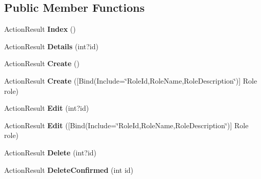 \subsection*{Public Member Functions}
\begin{DoxyCompactItemize}
\item 
Action\+Result {\bfseries Index} ()\hypertarget{class_p_c_builder_m_v_c_1_1_controllers_1_1_role_controller_a539d1b8b95c8cce64e2e6191070ab4f1}{}\label{class_p_c_builder_m_v_c_1_1_controllers_1_1_role_controller_a539d1b8b95c8cce64e2e6191070ab4f1}

\item 
Action\+Result {\bfseries Details} (int?id)\hypertarget{class_p_c_builder_m_v_c_1_1_controllers_1_1_role_controller_a622d75d4760677d73ecef02d8b7e4112}{}\label{class_p_c_builder_m_v_c_1_1_controllers_1_1_role_controller_a622d75d4760677d73ecef02d8b7e4112}

\item 
Action\+Result {\bfseries Create} ()\hypertarget{class_p_c_builder_m_v_c_1_1_controllers_1_1_role_controller_ac7d1a9619975e3e734535a104731fab4}{}\label{class_p_c_builder_m_v_c_1_1_controllers_1_1_role_controller_ac7d1a9619975e3e734535a104731fab4}

\item 
Action\+Result {\bfseries Create} (\mbox{[}Bind(Include=\char`\"{}Role\+Id,Role\+Name,Role\+Description\char`\"{})\mbox{]} Role role)\hypertarget{class_p_c_builder_m_v_c_1_1_controllers_1_1_role_controller_a380152084b9a7911121f64f4c7890c53}{}\label{class_p_c_builder_m_v_c_1_1_controllers_1_1_role_controller_a380152084b9a7911121f64f4c7890c53}

\item 
Action\+Result {\bfseries Edit} (int?id)\hypertarget{class_p_c_builder_m_v_c_1_1_controllers_1_1_role_controller_acfe183da8623b0e5ceaa1e345b78c83f}{}\label{class_p_c_builder_m_v_c_1_1_controllers_1_1_role_controller_acfe183da8623b0e5ceaa1e345b78c83f}

\item 
Action\+Result {\bfseries Edit} (\mbox{[}Bind(Include=\char`\"{}Role\+Id,Role\+Name,Role\+Description\char`\"{})\mbox{]} Role role)\hypertarget{class_p_c_builder_m_v_c_1_1_controllers_1_1_role_controller_a7726bbef911a2d11d6dd051a1ad336be}{}\label{class_p_c_builder_m_v_c_1_1_controllers_1_1_role_controller_a7726bbef911a2d11d6dd051a1ad336be}

\item 
Action\+Result {\bfseries Delete} (int?id)\hypertarget{class_p_c_builder_m_v_c_1_1_controllers_1_1_role_controller_a9b8397f06d1f42fa5aca85d14d9ac8cf}{}\label{class_p_c_builder_m_v_c_1_1_controllers_1_1_role_controller_a9b8397f06d1f42fa5aca85d14d9ac8cf}

\item 
Action\+Result {\bfseries Delete\+Confirmed} (int id)\hypertarget{class_p_c_builder_m_v_c_1_1_controllers_1_1_role_controller_a9f7f7bd802c01e7fd33c2d5b14b7ca3e}{}\label{class_p_c_builder_m_v_c_1_1_controllers_1_1_role_controller_a9f7f7bd802c01e7fd33c2d5b14b7ca3e}

\end{DoxyCompactItemize}
